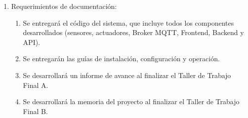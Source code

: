 \begin{enumerate}
	\item Requerimientos de documentación:
	      \begin{enumerate}
		      \item Se entregará el código del sistema, que incluye todos los componentes desarrollados (sensores, actuadores, Broker MQTT, Frontend, Backend y API).
		      \item Se entregarán las guías de instalación, configuración y operación.
		      \item Se desarrollará un informe de avance al finalizar el Taller de Trabajo Final A.
		      \item Se desarrollará la memoria del proyecto al finalizar el Taller de Trabajo Final B.
	      \end{enumerate}
\end{enumerate}
